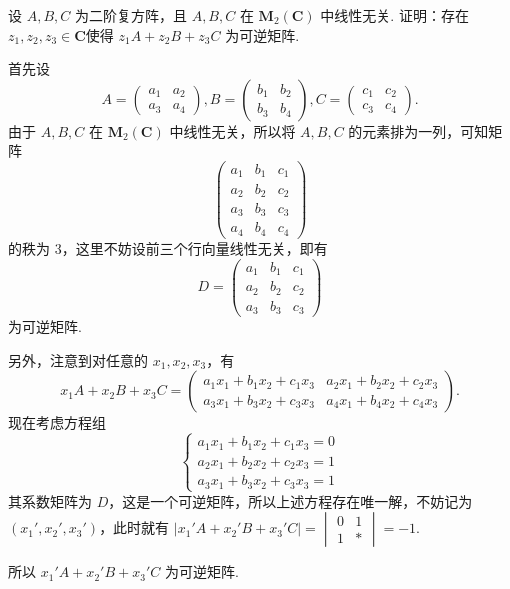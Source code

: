 \begin{exercise}
\begin{exgroup}
\begin{answer}
        \end{answer}

        \item 设 $A,B,C$ 为二阶复方阵，且 $A,B,C$ 在 $\mathbf{M}_2(\mathbf{C})$ 中线性无关. 证明：存在$z_1,z_2,z_3 \in \mathbf{C}$使得 $z_1A+z_2B+z_3C$ 为可逆矩阵.
        \begin{answer}
            首先设
            \[A=\begin{pmatrix}a_1 & a_2 \\ a_3 & a_4\end{pmatrix},B=\begin{pmatrix}b_1 & b_2 \\ b_3 & b_4\end{pmatrix},C=\begin{pmatrix}c_1 & c_2 \\ c_3 & c_4\end{pmatrix}.\]
            由于 $A,B,C$ 在 $\mathbf{M}_2(\mathbf{C})$ 中线性无关，所以将 $A,B,C$ 的元素排为一列，可知矩阵
            \[\begin{pmatrix}a_1 & b_1 & c_1 \\ a_2 & b_2 & c_2 \\ a_3 & b_3 & c_3 \\ a_4 & b_4 & c_4\end{pmatrix}\]
            的秩为 3，这里不妨设前三个行向量线性无关，即有
            \[D=\begin{pmatrix}a_1 & b_1 & c_1 \\ a_2 & b_2 & c_2 \\ a_3 & b_3 & c_3\end{pmatrix}\]
            为可逆矩阵.

            另外，注意到对任意的 $x_1,x_2,x_3$，有
            \[x_1A+x_2B+x_3C=\begin{pmatrix}a_1x_1+b_1x_2+c_1x_3 & a_2x_1+b_2x_2+c_2x_3 \\ a_3x_1+b_3x_2+c_3x_3 & a_4x_1+b_4x_2+c_4x_3\end{pmatrix}.\]
            现在考虑方程组
            \[\begin{cases}a_1x_1+b_1x_2+c_1x_3 = 0 \\ a_2x_1+b_2x_2+c_2x_3 = 1 \\ a_3x_1+b_3x_2+c_3x_3 = 1\end{cases}\]
            其系数矩阵为 $D$，这是一个可逆矩阵，所以上述方程存在唯一解，不妨记为 $(x_1',x_2',x_3')$，此时就有 $\lvert x_1'A+x_2'B+x_3'C \rvert = \begin{vmatrix}0 & 1 \\ 1 & \ast\end{vmatrix} = -1$.

            所以 $x_1'A+x_2'B+x_3'C$ 为可逆矩阵.
        \end{answer}
    \end{exgroup}

\end{exercise}

